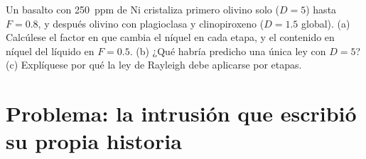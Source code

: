 \begin{exercise}[$\star\star\star$]\label{exo:b2:magmatic-differentiation:12}
Un basalto con \qty{250}{ppm} de Ni cristaliza primero olivino solo ($D = 5$) hasta
$F = 0.8$, y después olivino con plagioclasa y clinopiroxeno ($D = 1.5$ global). (a)
Calcúlese el factor en que cambia el níquel en cada etapa, y el contenido en níquel del
líquido en $F = 0.5$. (b) ¿Qué habría predicho una única ley con $D = 5$?
(c) Explíquese por qué la ley de Rayleigh debe aplicarse por etapas.
\end{exercise}

\section{Problema: la intrusión que escribió su propia historia}

